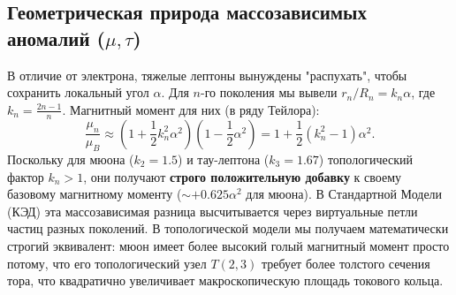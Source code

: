 \documentclass[11pt,a4paper]{article}
\begin{document}
\subsection{Геометрическая природа массозависимых аномалий ($\mu, \tau$)}
В отличие от электрона, тяжелые лептоны вынуждены "распухать", чтобы сохранить локальный угол $\alpha$. Для $n$-го поколения мы вывели $r_n / R_n = k_n \alpha$, где $k_n = \frac{2n-1}{n}$.
Магнитный момент для них (в ряду Тейлора):
\begin{equation}
	\frac{\mu_n}{\mu_B} \approx \left( 1 + \frac{1}{2} k_n^2 \alpha^2 \right) \left( 1 - \frac{1}{2}\alpha^2 \right) = 1 + \frac{1}{2}(k_n^2 - 1)\alpha^2.
\end{equation}
Поскольку для мюона ($k_2 = 1.5$) и тау-лептона ($k_3 = 1.67$) топологический фактор $k_n > 1$, они получают \textbf{строго положительную добавку} к своему базовому магнитному моменту ($\sim +0.625\alpha^2$ для мюона). 
В Стандартной Модели (КЭД) эта массозависимая разница высчитывается через виртуальные петли частиц разных поколений. В топологической модели мы получаем математически строгий эквивалент: мюон имеет более высокий голый магнитный момент просто потому, что его топологический узел $T(2,3)$ требует более толстого сечения тора, что квадратично увеличивает макроскопическую площадь токового кольца.
\end{document}
